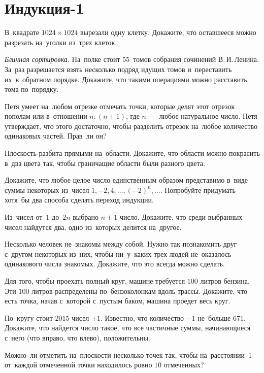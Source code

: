 
\section*{Индукция-1}


\begin{problems}

\item
В~квадрате $1024 \times 1024$ вырезали одну клетку.
Докажите, что оставшееся можно разрезать на~уголки из~трех клеток.

\item\emph{Блинная сортировка.}
На~полке стоит $55$~томов собрания сочинений В.\,И.\,Ленина.
За~раз разрешается взять несколько подряд идущих томов и~переставить
их~в~обратном порядке.
Докажите, что такими операциями можно расставить тома по~порядку.

\item
Петя умеет на~любом отрезке отмечать точки, которые делят этот отрезок пополам
или в~отношении $n : (n + 1)$, где $n$~--- любое натуральное число.
Петя утверждает, что этого достаточно, чтобы разделить отрезок на~любое
количество одинаковых частей.
Прав~ли он?

\item
Плоскость разбита прямыми на~области.
Докажите, что области можно покрасить в~два цвета так, чтобы граничащие области
были разного цвета.

\item
Докажите, что любое целое число единственным образом представимо в~виде суммы
некоторых из~чисел $1, -2, 4, \ldots, (-2)^n, \ldots$.
Попробуйте придумать хотя~бы два способа сделать переход индукции.

\item
Из~чисел от~$1$ до~$2 n$ выбрано $n + 1$ число.
Докажите, что среди выбранных чисел найдутся два, одно из~которых делится на~другое.

\item
Несколько человек не~знакомы между собой.
Нужно так познакомить друг с~другом некоторых из~них, чтобы ни~у~каких трех
людей не~оказалось одинакового числа знакомых.
Докажите, что это всегда можно сделать.

\item
Для того, чтобы проехать полный круг, машине требуется $100$ литров бензина.
Эти $100$ литров распределены по~бензоколонкам вдоль трассы.
Докажите, что есть точка, начав с~которой с~пустым баком, машина проедет весь
круг.

\item
По~кругу стоит $2015$ чисел $\pm 1$.
Известно, что количество $-1$ не~больше $671$.
Докажите, что найдется число такое, что все частичные суммы, начинающиеся с~него (что вправо, что влево), положительны.

\item
Можно~ли отметить на~плоскости несколько точек так, чтобы на~расстоянии~$1$
от~каждой отмеченной точки находилось ровно $10$ отмеченных?

\end{problems}

